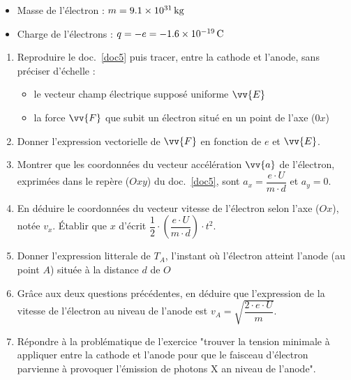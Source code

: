 \documentclass[a4paper,11pt,fleqn]{scrartcl}%
\begin{document}
\begin{data}
    \begin{itemize}
        \item Masse de l'électron : $m = \SI{9,1E31}{kg}$
        \item Charge de l'électrons : $q = -e = \SI{-1,6E-19}{C}$
    \end{itemize}
\end{data}

\begin{enumerate}
    \item Reproduire le doc.~\ref{doc5} puis tracer, entre la cathode et l'anode, sans préciser d'échelle :\begin{itemize}
        \item le vecteur champ électrique supposé uniforme $\vv{E}$
        \item la force $\vv{F}$ que subit un électron situé en un point de l'axe ($0x$)
    \end{itemize}
    \item Donner l'expression vectorielle de $\vv{F}$ en fonction de $e$ et $\vv{E}$.
    \item Montrer que les coordonnées du vecteur accélération $\vv{a}$ de l'électron, exprimées dans le repère ($Oxy$) du doc.~\ref{doc5}, sont $a_x = \dfrac{e\cdot U}{m \cdot d}$ et $a_y = 0$.
    \item En déduire le coordonnées du vecteur vitesse de l'électron selon l'axe ($Ox$), notée $v_x$. Établir que $x$ d'écrit $ \dfrac{1}{2} \cdot \left(\dfrac{e\cdot U}{m \cdot d}\right) \cdot t^2$.
    \item Donner l'expression litterale de $T_A$, l'instant où l'électron atteint l'anode (au point $A$) située à la distance $d$ de $O$
    \item Grâce aux deux questions précédentes, en déduire que l'expression de la vitesse de l'électron au niveau de l'anode est $v_A = \sqrt{\dfrac{2\cdot e \cdot U}{m}}$.
    \item Répondre à la problématique de l’exercice "trouver la tension minimale à appliquer entre la cathode et l’anode pour que le faisceau d’électron parvienne à provoquer l’émission de photons X an niveau de l’anode".
\end{enumerate}
\end{document}

